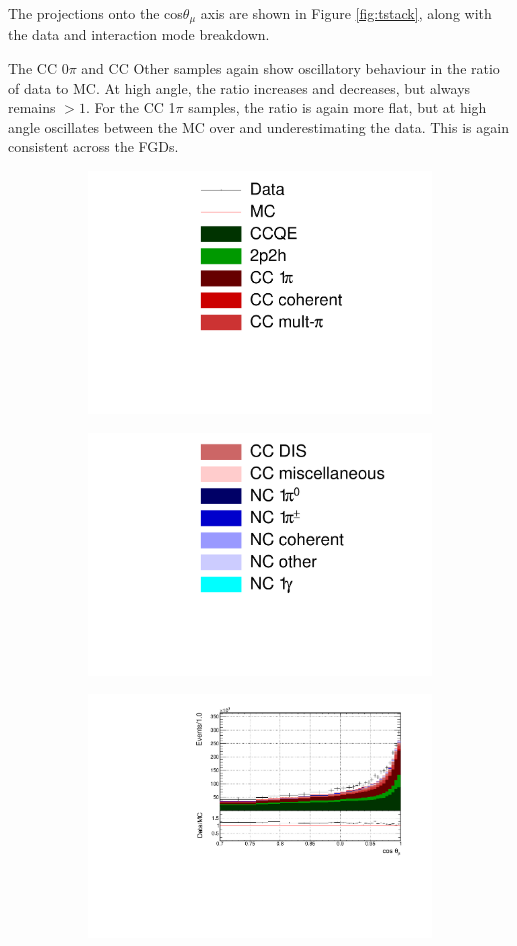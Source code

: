 The projections onto the cos$\theta_{\mu}$ axis are shown in Figure \ref{fig:tstack}, along with the data and interaction mode breakdown.

The CC 0$\pi$ and CC Other samples again show oscillatory behaviour in the ratio of data to MC. At high angle, the ratio increases and decreases, but always remains $>1$. For the CC 1$\pi$ samples,  the ratio is again more flat, but at high angle oscillates between the MC over and underestimating the data. This is again consistent across the FGDs.

\begin{figure}
\centering
\begin{subfigure}{.35\textwidth}
  \centering
  \includegraphics[width=0.7\linewidth]{figs/legend}
\end{subfigure}
\begin{subfigure}{.35\textwidth}
  \centering
  \includegraphics[width=0.7\linewidth]{figs/legend2}
\end{subfigure}
\begin{subfigure}{.32\textwidth}
  \centering
  \includegraphics[width=0.95\linewidth]{figs/FGD1_numuCC_0pi_t}

\end{subfigure}
\end{figure}
